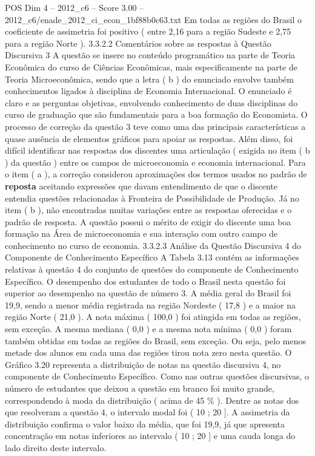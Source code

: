 \begin{textsample}{POS Dim 4 – 2012\_c6 – Score 3.00 – 2012\_c6/enade\_2012\_ci\_econ\_1bf88b0c63.txt}
Em todas as regiões do Brasil o coeficiente de assimetria foi positivo ( entre 2,16 para a região Sudeste e 2,75 para a região Norte ). 3.3.2.2 Comentários sobre as respostas à Questão Discursiva 3 A questão se insere no conteúdo programático na parte de Teoria Econômica do curso de Ciências Econômicas, mais especificamente na parte de Teoria Microeconômica, sendo que a letra ( b ) do enunciado envolve também conhecimentos ligados à disciplina de Economia Internacional.
O enunciado é claro e as perguntas objetivas, envolvendo conhecimento de duas disciplinas do curso de graduação que são fundamentais para a boa formação do Economista.
O processo de correção da questão 3 teve como uma das principais características a quase ausência de elementos gráficos para apoiar as respostas.
Além disso, foi difícil identificar nas respostas dos discentes uma articulação ( exigida no item ( b ) da questão ) entre os campos de microeconomia e economia internacional.
Para o item ( a ), a correção considerou aproximações dos termos usados no padrão de \textbf{reposta} aceitando expressões que davam entendimento de que o discente entendia questões relacionadas à Fronteira de Possibilidade de Produção.
Já no item ( b ), não encontradas muitas variações entre as respostas oferecidas e o padrão de resposta.
A questão possui o mérito de exigir do discente uma boa formação na Área de microeconomia e sua interação com outro campo de conhecimento no curso de economia. 3.3.2.3 Análise da Questão Discursiva 4 do Componente de Conhecimento Específico A Tabela 3.13 contém as informações relativas à questão 4 do conjunto de questões do componente de Conhecimento Específico.
O desempenho dos estudantes de todo o Brasil nesta questão foi superior ao desempenho na questão de número 3.
A média geral do Brasil foi 19,9, sendo a menor média registrada na região Nordeste ( 17,8 ) e a maior na região Norte ( 21,0 ).
A nota máxima ( 100,0 ) foi atingida em todas as regiões, sem exceção.
A mesma mediana ( 0,0 ) e a mesma nota mínima ( 0,0 ) foram também obtidas em todas as regiões do Brasil, sem exceção.
Ou seja, pelo menos metade dos alunos em cada uma das regiões tirou nota zero nesta questão.
O Gráfico 3.20 representa a distribuição de notas na questão discursiva 4, no componente de Conhecimento Específico.
Como nas outras questões discursivas, o número de estudantes que deixou a questão em branco foi muito grande, correspondendo à moda da distribuição ( acima de 45 \% ).
Dentre as notas dos que resolveram a questão 4, o intervalo modal foi ( 10 ; 20 ].
A assimetria da distribuição confirma o valor baixo da média, que foi 19,9, já que apresenta concentração em notas inferiores ao intervalo ( 10 ; 20 ] e uma cauda longa do lado direito deste intervalo.

\end{textsample}
